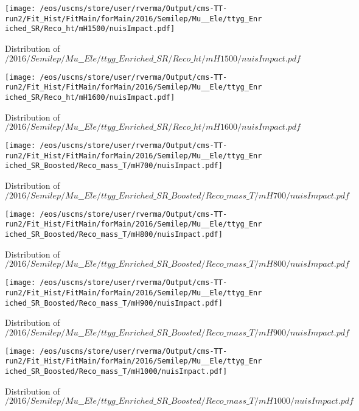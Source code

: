 \begin{figure}
\centering
\texttt{[image: /eos/uscms/store/user/rverma/Output/cms-TT-run2/Fit\_Hist/FitMain/forMain/2016/Semilep/Mu\_\_Ele/ttyg\_Enriched\_SR/Reco\_ht/mH1500/nuisImpact.pdf]}
\caption{Distribution of $/2016/Semilep/Mu\_\_Ele/ttyg\_Enriched\_SR/Reco\_ht/mH1500/nuisImpact.pdf$}
\end{figure}

\begin{figure}
\centering
\texttt{[image: /eos/uscms/store/user/rverma/Output/cms-TT-run2/Fit\_Hist/FitMain/forMain/2016/Semilep/Mu\_\_Ele/ttyg\_Enriched\_SR/Reco\_ht/mH1600/nuisImpact.pdf]}
\caption{Distribution of $/2016/Semilep/Mu\_\_Ele/ttyg\_Enriched\_SR/Reco\_ht/mH1600/nuisImpact.pdf$}
\end{figure}

\begin{figure}
\centering
\texttt{[image: /eos/uscms/store/user/rverma/Output/cms-TT-run2/Fit\_Hist/FitMain/forMain/2016/Semilep/Mu\_\_Ele/ttyg\_Enriched\_SR\_Boosted/Reco\_mass\_T/mH700/nuisImpact.pdf]}
\caption{Distribution of $/2016/Semilep/Mu\_\_Ele/ttyg\_Enriched\_SR\_Boosted/Reco\_mass\_T/mH700/nuisImpact.pdf$}
\end{figure}

\begin{figure}
\centering
\texttt{[image: /eos/uscms/store/user/rverma/Output/cms-TT-run2/Fit\_Hist/FitMain/forMain/2016/Semilep/Mu\_\_Ele/ttyg\_Enriched\_SR\_Boosted/Reco\_mass\_T/mH800/nuisImpact.pdf]}
\caption{Distribution of $/2016/Semilep/Mu\_\_Ele/ttyg\_Enriched\_SR\_Boosted/Reco\_mass\_T/mH800/nuisImpact.pdf$}
\end{figure}

\begin{figure}
\centering
\texttt{[image: /eos/uscms/store/user/rverma/Output/cms-TT-run2/Fit\_Hist/FitMain/forMain/2016/Semilep/Mu\_\_Ele/ttyg\_Enriched\_SR\_Boosted/Reco\_mass\_T/mH900/nuisImpact.pdf]}
\caption{Distribution of $/2016/Semilep/Mu\_\_Ele/ttyg\_Enriched\_SR\_Boosted/Reco\_mass\_T/mH900/nuisImpact.pdf$}
\end{figure}

\begin{figure}
\centering
\texttt{[image: /eos/uscms/store/user/rverma/Output/cms-TT-run2/Fit\_Hist/FitMain/forMain/2016/Semilep/Mu\_\_Ele/ttyg\_Enriched\_SR\_Boosted/Reco\_mass\_T/mH1000/nuisImpact.pdf]}
\caption{Distribution of $/2016/Semilep/Mu\_\_Ele/ttyg\_Enriched\_SR\_Boosted/Reco\_mass\_T/mH1000/nuisImpact.pdf$}
\end{figure}

